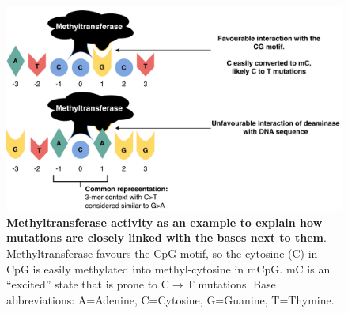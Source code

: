 \begin{figure}[ht!]
    \centering
    \includegraphics[scale=0.75]{graphics/motif_demo.pdf}
    \caption{\textbf{Methyltransferase activity as an example to explain how mutations are closely linked with the bases next to them}. Methyltransferase favours the CpG motif, so the cytosine (C) in CpG is easily methylated into methyl-cytosine in mCpG. mC is an ``excited'' state that is prone to C$\rightarrow$T mutations. Base abbreviations: A=Adenine, C=Cytosine, G=Guanine, T=Thymine.}
    \label{fig:motif_demo}
\end{figure}
